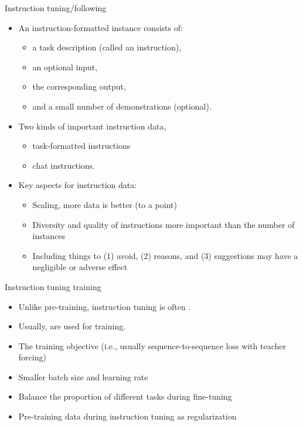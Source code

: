 \documentclass[10pt]{beamer}
\begin{document}

\begin{frame}{Instruction tuning/following}

\begin{itemize}
\item An instruction-formatted instance consists of:
\begin{itemize}
\item a task description (called an instruction),
\item an optional input,
\item the corresponding output,
\item and a small number of demonstrations (optional).
\end{itemize}
\pause
\item Two kinds of important instruction data,
\begin{itemize}
\item task-formatted instructions
\item chat instructions.
\end{itemize}
\pause
\item Key aspects for instruction data:
\begin{itemize}
\item Scaling, more data is better (to a point) %
\item Diversity and quality of instructions more important than the number of instances
\item Including things to (1) avoid, (2) reasons, and (3) suggestions may have a negligible or adverse effect
\end{itemize}
\end{itemize}

\end{frame}

\begin{frame}{Instruction tuning training}

\begin{itemize}
\item Unlike pre-training, instruction tuning is often .
\item Usually,  are used for training.
\pause
\item The training objective (i.e., usually sequence-to-sequence loss with teacher forcing)
\pause
\item Smaller batch size and learning rate
\pause
\item Balance the proportion of different tasks during fine-tuning
\pause
\item Pre-training data during instruction tuning as regularization%
\end{itemize}

\end{frame}
\end{document}
